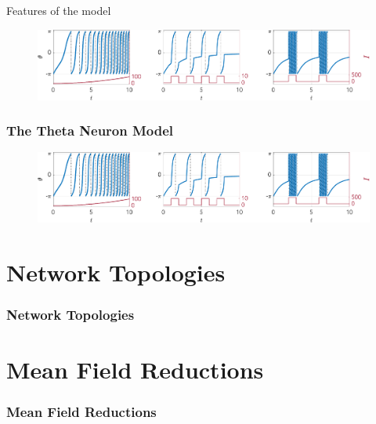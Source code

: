 \begin{frame}
\begin{figure}[H]
\endminipage
\label{fig:thetaneuronbifurcationtikz}
\end{figure}

Features of the model
\begin{figure}[H]
\centering
\includegraphics[width = \textwidth]{../Figures/ThetaNeuronResponseToCurrent.pdf}
\label{fig:ThetaNeuronResponseToCurrent}
\end{figure}
\end{frame}

\begin{frame}
\frametitle{The Theta Neuron Model}
\begin{figure}[H]
\centering
\includegraphics[width = \textwidth]{../Figures/ThetaNeuronResponseToCurrent.pdf}
\label{fig:ThetaNeuronResponseToCurrent}
\end{figure}
\end{frame}



\section{Network Topologies}
\begin{frame}
\frametitle{Network Topologies}
\end{frame}


\section{Mean Field Reductions}
\begin{frame}
\frametitle{Mean Field Reductions}
\end{frame}

